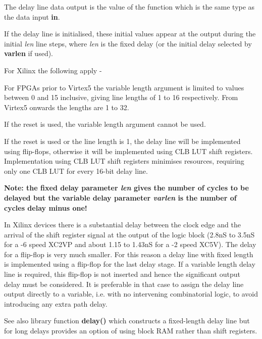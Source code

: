             The delay line data output is the value of the function which is
            the same type as the data input {\bf in}.

            If the delay line is initialised, these initial values appear at the
            output during the initial {\em len} line steps, where {\em len} is the
            fixed delay (or the initial delay selected by {\bf varlen}
            if used).

            For Xilinx the following apply -
            \blist
            \item   For FPGAs prior to Virtex5 the variable length argument is limited to values
                    between 0 and 15 inclusive, giving line lengths of 1 to
                    16 respectively. From Virtex5 onwards the lengths are 1 to 32.
            \item   If the reset is used, the variable length argument cannot be
                    used.
            \item   If the reset is used or the line length is 1, the delay line
                    will be implemented using flip-flops, otherwise it will be
                    implemented using CLB LUT shift registers.
            \blend
            Implementation using CLB LUT shift registers minimises resources,
            requiring only one CLB LUT for every 16-bit delay line.

            {\bf Note: the fixed delay parameter {\em len} gives the number of
            cycles to be delayed but the variable delay parameter {\em varlen}
            is the number of cycles delay minus one!}      

            In Xilinx devices there is a substantial delay between the clock
            edge and the arrival of the shift register signal at the output of
            the logic block (2.8nS to 3.5nS for a -6 speed XC2VP and about 1.15
            to 1.43nS for  a -2 speed XC5V). The delay for a flip-flop is very
            much smaller. For this reason a delay line with fixed length is
            implemented using a flip-flop for the last delay stage. If a
            variable length delay line is required, this flip-flop is not
            inserted and hence the significant output delay must be considered.
            It is preferable in that case to assign the delay line output
            directly to a variable, i.e. with no intervening combinatorial
            logic, to avoid introducing any extra path delay.

            See also library function {\bf delay()} 
            which constructs a fixed-length delay line but for long delays
            provides an option of using block RAM rather than shift registers.



